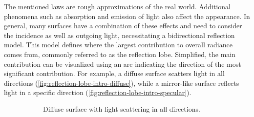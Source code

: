 The mentioned laws are rough approximations of the real world. Additional phenomena such as absorption and emission of light also affect the appearance. In general, many surfaces have a combination of these effects and need to consider the incidence as well as outgoing light, necessitating a bidirectional reflection model. This model defines where the largest contribution to overall radiance comes from, commonly referred to as the reflection lobe. Simplified, the main contribution can be visualized using an arc indicating the direction of the most significant contribution.
 For example, a diffuse surface scatters light in all directions (\autoref{fig:reflection-lobe-intro-diffuse}), while a mirror-like surface reflects light in a specific direction (\autoref{fig:reflection-lobe-intro-specular}).

\begin{figure}[H]
  \centering
  \begin{subfigure}[t]{0.45\textwidth}
    \caption{Diffuse surface with light scattering in all directions.}
    \label{fig:reflection-lobe-intro-diffuse}
  \end{subfigure}
  \hfill
  \begin{subfigure}[t]{0.45\textwidth}
\end{subfigure}
\end{figure}
